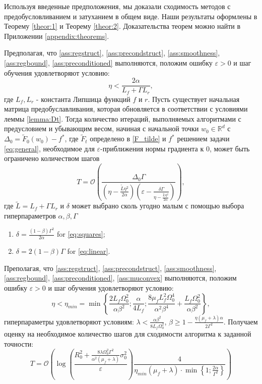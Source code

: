 Используя введенные предположения, мы доказали сходимость методов с предобусловливанием и затуханием в общем виде. Наши результаты оформлены в Теорему \ref{theor:1} и Теорему \ref{theor:2}. Доказательства теорем можно найти в Приложении \ref{appendix:theorems}.

\begin{theorem} 
    \label{theor:1}
    Предполагая, что \ref{ass:regstruct}, \ref{ass:precondstruct}, \ref{ass:smoothness}, \ref{ass:regbound}, \ref{ass:preconditioned} выполняются, положим ошибку $\varepsilon > 0$ и шаг обучения удовлетворяют условию:
    \begin{equation*}
        \eta < \frac{2 \alpha}{L_f + \Gamma L_{r}},
    \end{equation*}
    где $L_f, L_{r}$ - константа Липшица функций $f$ и $r$. 
    Пусть существует начальная матрица предобуславливания, которая обновляется в соответствии с условиями леммы \ref{lemma:Dt}.
    Тогда количество итераций, выполняемых алгоритмами с предусловием и убывающим весом, начиная с начальной точки
    $w_0 \in \mathbb{R}^d$ с $\Delta_0 = \tilde{F}_0(w_0) - f^*$, где $\widetilde{F}_t$ определено в \eqref{F_tilde} и $f^*$ решением задачи \eqref{eq:general}, 
    необходимое для $\varepsilon$-приближения нормы градиента к 0, может быть ограничено количеством шагов    
    \begin{equation*}
      T = \mathcal{O}\left( \frac{\Delta_0 \Gamma}{(\eta - \frac{\tilde{L}\eta^2}{2\alpha}) \left( \varepsilon -\frac{\delta\Gamma}{\eta - \frac{\tilde{L}\eta^2}{2\alpha}}\right)} \right),
\end{equation*}
где $\widetilde{L} = L_f + \Gamma L_{r}$ и $\delta$ может выбрано сколь угодно малым с помощью выбора гиперпараметров $\alpha, \beta, \Gamma$
\begin{enumerate}
    \item $\delta=\frac{(1 - \beta)\Gamma^2}{2\alpha}$ for \eqref{eq:squares};
    \item $\delta=2(1 - \beta)\Gamma$ for \eqref{eq:linear}.
\end{enumerate}
\end{theorem}

\begin{theorem}
\label{theor:2}
    Преполагая, что \ref{ass:regstruct}, \ref{ass:precondstruct}, \ref{ass:smoothness}, \ref{ass:regbound}, \ref{ass:preconditioned}, \ref{ass:muconvex} выполняются, положим ошибку $\varepsilon > 0$ и шаг обучения удовлетворяют условию: 
    $$
    \eta < \eta_{min} = \min \left\{ \frac{2L_f \Omega_0^2}{\alpha \beta^2}; \frac{\alpha}{4L_f}; \frac{8\mu_f L_f^2 \Omega_0^4}{\alpha^2 \beta^4} + \frac{L_f \Omega_0^2}{\alpha \beta^2} \right\},
    $$ гиперпараметры удовлетворяют условиям: $\lambda < \frac{\alpha \beta^2}{8L_f \Omega_0^2}$, $\beta \geq 1 - \frac{\eta(\mu_f + \lambda)\alpha}{2 \Gamma^2}$. Получаем оценку на необходимое количество шагов для сходимости алгоритма к заданной точности:
    $$T = \mathcal{O} \left(\log\left(\frac{R_0^2 + \frac{8\lambda \Omega_0^2 \Gamma^2}{\alpha^2(\mu_f+\lambda)} \sigma_0^2}{\varepsilon} \right) \frac{4}{\eta_{min} (\mu_f + \lambda)\cdot \min \left\{1; \frac{2\alpha}{\Gamma^2} \right\} } \right)$$
\end{theorem}

